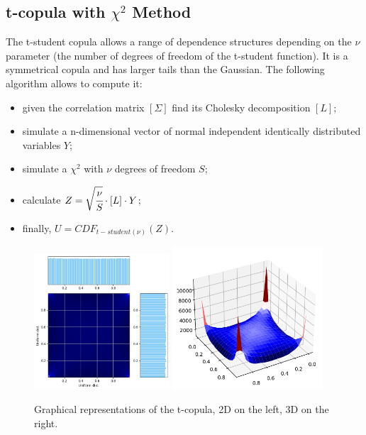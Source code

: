 \subsection{t-copula with $\chi^2$ Method}
\label{sec:t-student_copula}
The t-student copula allows a range of dependence structures depending
on the $\nu$ parameter (the number of degrees of freedom of the t-student function).
It is a symmetrical copula and has larger tails than the Gaussian. The following algorithm allows to compute it:
\begin{itemize}
\item given the correlation matrix $[\Sigma]$ find its Cholesky decomposition $[L]$;
\item simulate a n-dimensional vector of normal independent identically distributed variables $Y$;
\item simulate a $\chi^2$ with $\nu$ degrees of freedom $S$;
\item calculate $Z = \sqrt{\cfrac{\nu}{S}}\cdot [L] \cdot Y$;
\item finally, $U = CDF_{t-student(\nu)}(Z)$.
\end{itemize}


\begin{figure}[htbp]
\centering
\includegraphics[width=0.45\textwidth]{figures/t-copula_2d}
\quad
\includegraphics[width=0.5\textwidth]{figures/t-copula_3d}
\caption{Graphical representations of the t-copula, 2D on the left, 3D on the right.}
\label{fig:t-copula}
\end{figure}

